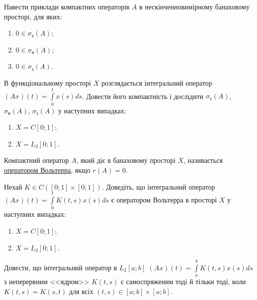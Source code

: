\begin{exercise}
    Навести приклади компактних операторів $A$ в нескінченновимірному
    банаховому просторі, для яких:
    \begin{enumerate}
        \item $0 \in \sigma_{\text{т}} (A)$;
        \item $0 \in \sigma_{\text{н}} (A)$;
        \item $0 \in \sigma_{\text{з}} (A)$.
    \end{enumerate}
\end{exercise}

\begin{exercise}
    В функціональному просторі $X$ розглядається інтегральний оператор 
    $(Ax)(t) = \int\limits_0^t x(s) ds$. Довести його компактність і дослідити
    $\sigma_{\text{т}} (A)$, $\sigma_{\text{н}} (A)$, $\sigma_{\text{з}} (A)$
    у наступних випадках:
    \begin{enumerate}
        \item $X = C[0;1]$;
        \item $X = L_2 [0;1]$.
    \end{enumerate}
\end{exercise}

\begin{theory}
    Компактний оператор $A$, який діє в банаховому просторі $X$, називається
    \ul{оператором Вольтерра}, якщо $r(A) = 0$.
\end{theory}

\begin{exercise}
    Нехай $K \in C([0;1] \times [0;1])$. Доведіть, що інтегральний оператор
    $(Ax)(t) = \int\limits_0^t K(t,s) x(s)ds$ є оператором Вольтерра
    в просторі $X$ у наступних випадках:
    \begin{enumerate}
        \item $X = C[0;1]$;
        \item $X = L_2 [0;1]$. 
    \end{enumerate}
\end{exercise}

\begin{exercise}
    Довести, що інтегральний оператор в $L_2[a;b]$
    $(Ax)(t) = \int\limits_a^b K(t,s) x(s)ds$ з неперервним
    <<ядром>> $K(t,s)$ є самоспряженим тоді й тільки тоді, коли
    $K(t,s) = \overline{K(s,t)}$ для всіх $(t,s) \in [a;b] \times [a;b]$.
\end{exercise}

